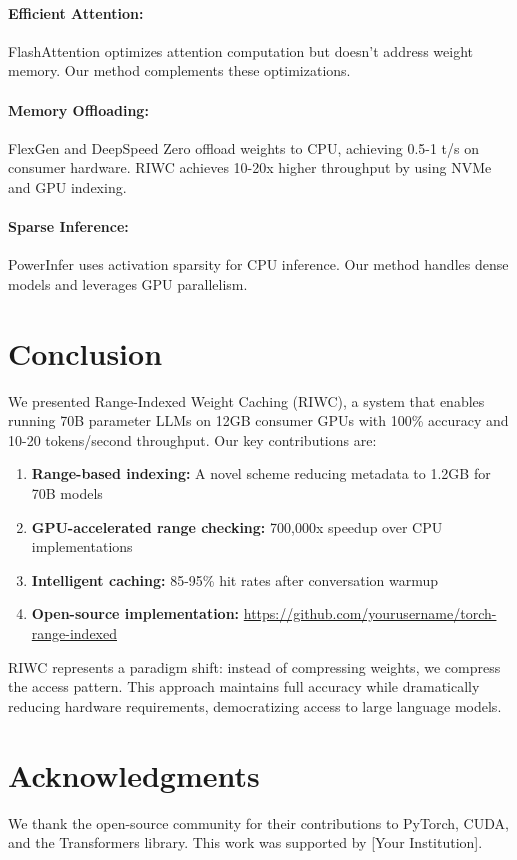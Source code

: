\documentclass[twocolumn,10pt]{article}
\begin{document}
\paragraph{Efficient Attention:} FlashAttention \cite{dao2022flashattention} optimizes attention computation but doesn't address weight memory. Our method complements these optimizations.

\paragraph{Memory Offloading:} FlexGen \cite{sheng2023flexgen} and DeepSpeed Zero \cite{rajbhandari2020deepspeed} offload weights to CPU, achieving 0.5-1 t/s on consumer hardware. RIWC achieves 10-20x higher throughput by using NVMe and GPU indexing.

\paragraph{Sparse Inference:} PowerInfer \cite{xue2023powerinfer} uses activation sparsity for CPU inference. Our method handles dense models and leverages GPU parallelism.

\section{Conclusion}

We presented Range-Indexed Weight Caching (RIWC), a system that enables running 70B parameter LLMs on 12GB consumer GPUs with 100\% accuracy and 10-20 tokens/second throughput. Our key contributions are:

\begin{enumerate}
    \item \textbf{Range-based indexing:} A novel scheme reducing metadata to 1.2GB for 70B models
    \item \textbf{GPU-accelerated range checking:} 700,000x speedup over CPU implementations
    \item \textbf{Intelligent caching:} 85-95\% hit rates after conversation warmup
    \item \textbf{Open-source implementation:} \url{https://github.com/yourusername/torch-range-indexed}
\end{enumerate}

RIWC represents a paradigm shift: instead of compressing weights, we compress the access pattern. This approach maintains full accuracy while dramatically reducing hardware requirements, democratizing access to large language models.

\section*{Acknowledgments}

We thank the open-source community for their contributions to PyTorch, CUDA, and the Transformers library. This work was supported by [Your Institution].

\balance



\end{document}
